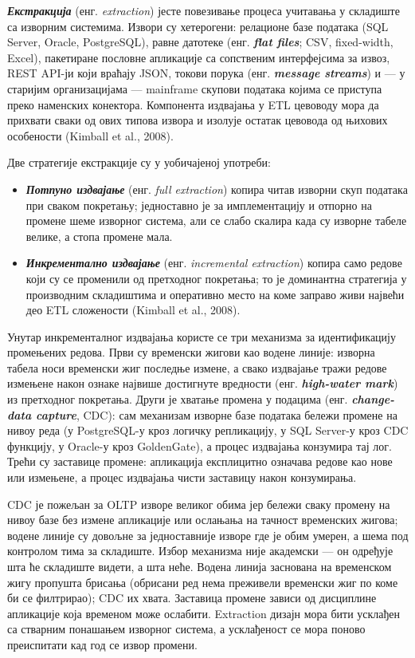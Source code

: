 \textbf{\textit{Екстракција}} (енг. \textit{extraction}) јесте повезивање процеса учитавања у складиште са изворним системима. Извори су хетерогени: релационе базе података (SQL Server, Oracle, PostgreSQL), равне датотеке (енг. \textbf{\textit{flat files}}; CSV, fixed-width, Excel), пакетиране пословне апликације са сопственим интерфејсима за извоз, REST API-ји који враћају JSON, токови порука (енг. \textbf{\textit{message streams}}) и — у старијим организацијама — mainframe скупови података којима се приступа преко наменских конектора. Компонента издвајања у ETL цевоводу мора да прихвати сваки од ових типова извора и изолује остатак цевовода од њихових особености (Kimball et al., 2008).

Две стратегије екстракције су у уобичајеној употреби:

\begin{itemize}
  \item \textbf{\textit{Потпуно издвајање}} (енг. \textit{full extraction}) копира читав изворни скуп података при сваком покретању; једноставно је за имплементацију и отпорно на промене шеме изворног система, али се слабо скалира када су изворне табеле велике, а стопа промене мала.
  \item \textbf{\textit{Инкрементално издвајање}} (енг. \textit{incremental extraction}) копира само редове који су се променили од претходног покретања; то је доминантна стратегија у производним складиштима и оперативно место на коме заправо живи највећи део ETL сложености (Kimball et al., 2008).
\end{itemize}
Унутар инкременталног издвајања користе се три механизма за идентификацију промењених редова. Први су временски жигови као водене линије: изворна табела носи временски жиг последње измене, а свако издвајање тражи редове измењене након ознаке највише достигнуте вредности (енг. \textbf{\textit{high-water mark}}) из претходног покретања. Други је хватање промена у подацима (енг. \textbf{\textit{change-data capture}}, CDC): сам механизам изворне базе података бележи промене на нивоу реда (у PostgreSQL-у кроз логичку репликацију, у SQL Server-у кроз CDC функцију, у Oracle-у кроз GoldenGate), а процес издвајања конзумира тај лог. Трећи су заставице промене: апликација експлицитно означава редове као нове или измењене, а процес издвајања чисти заставицу након конзумирања.

CDC је пожељан за OLTP изворе великог обима јер бележи сваку промену на нивоу базе без измене апликације или ослањања на тачност временских жигова; водене линије су довољне за једноставније изворе где је обим умерен, а шема под контролом тима за складиште. Избор механизма није академски — он одређује шта ће складиште видети, а шта неће. Водена линија заснована на временском жигу пропушта брисања (обрисани ред нема преживели временски жиг по коме би се филтрирао); CDC их хвата. Заставица промене зависи од дисциплине апликације која временом може ослабити. Extraction дизајн мора бити усклађен са стварним понашањем изворног система, а усклађеност се мора поново преиспитати кад год се извор промени.

